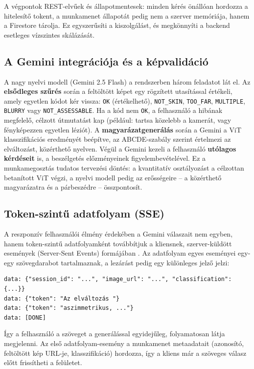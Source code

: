 A végpontok REST-elvűek és állapotmentesek: minden kérés önállóan hordozza a
hitelesítő tokent, a munkamenet állapotát pedig nem a szerver memóriája, hanem a
Firestore tárolja. Ez egyszerűsíti a kiszolgálást, és megkönnyíti a backend
esetleges vízszintes skálázását.

\subsection{A Gemini integrációja és a képvalidáció}

A nagy nyelvi modell (Gemini 2.5 Flash) a rendszerben három feladatot lát el. Az
\textbf{elsődleges szűrés} során a feltöltött képet egy rögzített utasítással
értékeli, amely egyetlen kódot kér vissza: \texttt{OK} (értékelhető),
\texttt{NOT\_SKIN}, \texttt{TOO\_FAR}, \texttt{MULTIPLE}, \texttt{BLURRY} vagy
\texttt{NOT\_ASSESSABLE}. Ha a kód nem \texttt{OK}, a felhasználó a hibának
megfelelő, célzott útmutatást kap (például: tartsa közelebb a kamerát, vagy
fényképezzen egyetlen léziót). A \textbf{magyarázatgenerálás} során a Gemini a
ViT klasszifikációs eredményét beépítve, az ABCDE-szabály szerint értelmezi az
elváltozást, közérthető nyelven. Végül a Gemini kezeli a felhasználó
\textbf{utólagos kérdéseit} is, a beszélgetés előzményeinek figyelembevételével.
Ez a munkamegosztás tudatos tervezési döntés: a kvantitatív osztályozást a
célzottan betanított ViT végzi, a nyelvi modell pedig az erősségeire -- a
közérthető magyarázatra és a párbeszédre -- összpontosít.

\subsection{Token-szintű adatfolyam (SSE)}

A reszponzív felhasználói élmény érdekében a Gemini válaszait nem egyben, hanem
token-szintű adatfolyamként továbbítjuk a kliensnek, szerver-küldött események
(Server-Sent Events) formájában \cite{whatwg_sse}. Az adatfolyam egyes
eseményei egy-egy szövegdarabot tartalmaznak, a lezárást pedig egy különleges
jelző jelzi:

\begin{verbatim}
data: {"session_id": "...", "image_url": "...", "classification": {...}}
data: {"token": "Az elváltozás "}
data: {"token": "aszimmetrikus, ..."}
data: [DONE]
\end{verbatim}

Így a felhasználó a szöveget a generálással egyidejűleg, folyamatosan látja
megjelenni. Az első adatfolyam-esemény a munkamenet metaadatait (azonosító,
feltöltött kép URL-je, klasszifikáció) hordozza, így a kliens már a szöveges
válasz előtt frissítheti a felületet.

